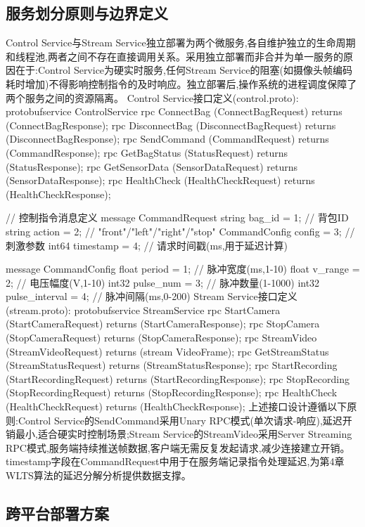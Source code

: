 \subsection{服务划分原则与边界定义}

Control Service与Stream Service独立部署为两个微服务,各自维护独立的生命周期和线程池,两者之间不存在直接调用关系。采用独立部署而非合并为单一服务的原因在于:Control Service为硬实时服务,任何Stream Service的阻塞(如摄像头帧编码耗时增加)不得影响控制指令的及时响应。独立部署后,操作系统的进程调度保障了两个服务之间的资源隔离。
Control Service接口定义(control.proto):
protobufservice ControlService {
  rpc ConnectBag    (ConnectBagRequest)    returns (ConnectBagResponse);
  rpc DisconnectBag (DisconnectBagRequest) returns (DisconnectBagResponse);
  rpc SendCommand   (CommandRequest)       returns (CommandResponse);
  rpc GetBagStatus  (StatusRequest)        returns (StatusResponse);
  rpc GetSensorData (SensorDataRequest)    returns (SensorDataResponse);
  rpc HealthCheck   (HealthCheckRequest)   returns (HealthCheckResponse);
}

// 控制指令消息定义
message CommandRequest {
  string bag_id   = 1;  // 背包ID
  string action   = 2;  // "front"/"left"/"right"/"stop"
  CommandConfig config = 3;  // 刺激参数
  int64 timestamp = 4;  // 请求时间戳(ms,用于延迟计算)
}

message CommandConfig {
  float period         = 1;  // 脉冲宽度(ms,1-10)
  float v_range        = 2;  // 电压幅度(V,1-10)
  int32 pulse_num      = 3;  // 脉冲数量(1-1000)
  int32 pulse_interval = 4;  // 脉冲间隔(ms,0-200)
}
Stream Service接口定义(stream.proto):
protobufservice StreamService {
  rpc StartCamera     (StartCameraRequest)     returns (StartCameraResponse);
  rpc StopCamera      (StopCameraRequest)      returns (StopCameraResponse);
  rpc StreamVideo     (StreamVideoRequest)     returns (stream VideoFrame);
  rpc GetStreamStatus (StreamStatusRequest)    returns (StreamStatusResponse);
  rpc StartRecording  (StartRecordingRequest)  returns (StartRecordingResponse);
  rpc StopRecording   (StopRecordingRequest)   returns (StopRecordingResponse);
  rpc HealthCheck     (HealthCheckRequest)     returns (HealthCheckResponse);
}
上述接口设计遵循以下原则:Control Service的SendCommand采用Unary RPC模式(单次请求-响应),延迟开销最小,适合硬实时控制场景;Stream Service的StreamVideo采用Server Streaming RPC模式,服务端持续推送帧数据,客户端无需反复发起请求,减少连接建立开销。timestamp字段在CommandRequest中用于在服务端记录指令处理延迟,为第4章WLTS算法的延迟分解分析提供数据支撑。
\subsection{跨平台部署方案}


